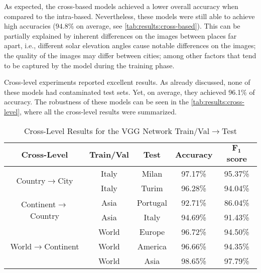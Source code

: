 \documentclass[journal]{IEEEtran}
\begin{document}
As expected, the cross-based models achieved a lower overall accuracy when compared to the intra-based. Nevertheless, these models were still able to achieve high accuracies ($94.8\%$ on average, see \autoref{tab:results:cross-based}). This can be partially explained by inherent differences on the images between places far apart, i.e., different solar elevation angles cause notable differences on the images; the quality of the images may differ between cities; among other factors that tend to be captured by the model during the training phase.

Cross-level experiments reported excellent results. As already discussed, none of these models had contaminated test sets. Yet, on average, they achieved 96.1\% of accuracy. The robustness of these models can be seen in the \autoref{tab:results:cross-level}, where all the cross-level results were summarized.

\begin{table}[h]
	\centering
	\caption{Cross-Level Results for the VGG Network \protect\linebreak Train/Val$\rightarrow$Test}
	\label{tab:results:cross-level}
	\begin{tabular}{ccccc}
		\toprule
		\textbf{Cross-Level}                           & \textbf{Train/Val} & \textbf{Test} & \textbf{Accuracy} & \textbf{$\bm{F_1}$ score} \\ \midrule
		\multirow{2}{*}{Country$\rightarrow$City}      & Italy              & Milan         & 97.17\%           & 95.37\%           \\
		& Italy              & Turim         & 96.28\%           & 94.04\%           \\ \midrule
		\multirow{2}{*}{Continent$\rightarrow$Country} & Asia               & Portugal      & 92.71\%           & 86.04\%           \\
		& Asia               & Italy         & 94.69\%           & 91.43\%           \\ \midrule
		\multirow{3}{*}{World$\rightarrow$Continent}   & World              & Europe        & 96.72\%           & 94.50\%           \\
		& World              & America       & 96.66\%           & 94.35\%           \\
		& World              & Asia          & 98.65\%           & 97.79\%           \\ \bottomrule
	\end{tabular}
\end{table}
\end{document}
